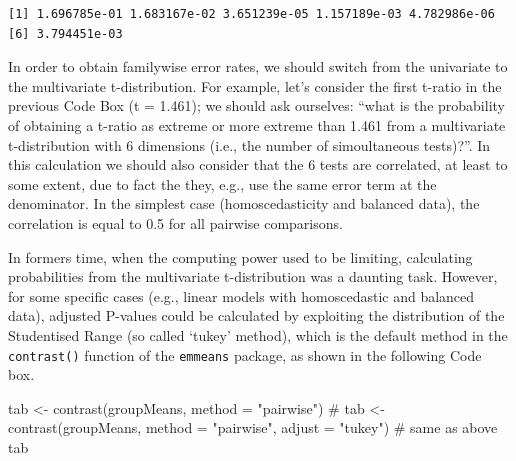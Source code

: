 \documentclass[
  letterpaper,
  DIV=11,
  numbers=noendperiod]{scrreprt}
\newenvironment{Shaded}{\begin{snugshade}}{\end{snugshade}}
\newcommand{\AttributeTok}[1]{\textcolor[rgb]{0.40,0.45,0.13}{#1}}
\newcommand{\CommentTok}[1]{\textcolor[rgb]{0.37,0.37,0.37}{#1}}
\newcommand{\ConstantTok}[1]{\textcolor[rgb]{0.56,0.35,0.01}{#1}}
\newcommand{\DecValTok}[1]{\textcolor[rgb]{0.68,0.00,0.00}{#1}}
\newcommand{\FunctionTok}[1]{\textcolor[rgb]{0.28,0.35,0.67}{#1}}
\newcommand{\NormalTok}[1]{\textcolor[rgb]{0.00,0.23,0.31}{#1}}
\newcommand{\OtherTok}[1]{\textcolor[rgb]{0.00,0.23,0.31}{#1}}
\newcommand{\SpecialCharTok}[1]{\textcolor[rgb]{0.37,0.37,0.37}{#1}}
\newcommand{\StringTok}[1]{\textcolor[rgb]{0.13,0.47,0.30}{#1}}
\begin{document}
\begin{Shaded}
\end{Shaded}

\begin{verbatim}
[1] 1.696785e-01 1.683167e-02 3.651239e-05 1.157189e-03 4.782986e-06
[6] 3.794451e-03
\end{verbatim}

In order to obtain familywise error rates, we should switch from the
univariate to the multivariate t-distribution. For example, let's
consider the first t-ratio in the previous Code Box (t = 1.461); we
should ask ourselves: ``what is the probability of obtaining a t-ratio
as extreme or more extreme than 1.461 from a multivariate t-distribution
with 6 dimensions (i.e., the number of simoultaneous tests)?''. In this
calculation we should also consider that the 6 tests are correlated, at
least to some extent, due to fact the they, e.g., use the same error
term at the denominator. In the simplest case (homoscedasticity and
balanced data), the correlation is equal to 0.5 for all pairwise
comparisons.

In formers time, when the computing power used to be limiting,
calculating probabilities from the multivariate t-distribution was a
daunting task. However, for some specific cases (e.g., linear models
with homoscedastic and balanced data), adjusted P-values could be
calculated by exploiting the distribution of the Studentised Range (so
called `tukey' method), which is the default method in the
\texttt{contrast()} function of the \texttt{emmeans} package, as shown
in the following Code box.

\begin{Shaded}
\begin{Highlighting}[]
\NormalTok{tab }\OtherTok{\textless{}{-}} \FunctionTok{contrast}\NormalTok{(groupMeans, }\AttributeTok{method =} \StringTok{"pairwise"}\NormalTok{)}
\CommentTok{\# tab \textless{}{-} contrast(groupMeans, method = "pairwise", adjust = "tukey") \# same as above}
\NormalTok{tab}
\end{Highlighting}
\end{Shaded}
\end{document}
